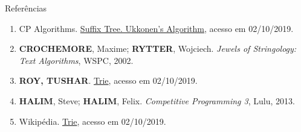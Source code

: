 \begin{frame}[fragile]{Referências}

    \begin{enumerate}
        \item CP Algorithms. \href{https://cp-algorithms.com/string/suffix-tree-ukkonen.html}{Suffix Tree. Ukkonen's Algorithm}, acesso em 02/10/2019. 
 
        \item \textbf{CROCHEMORE}, Maxime; \textbf{RYTTER}, Wojciech. \textit{Jewels of Stringology: Text Algorithms}, WSPC, 2002.

        \item \textbf{ROY, TUSHAR}. \href{https://www.youtube.com/watch?v=AXjmTQ8LEoI}{Trie}, acesso em 02/10/2019.
 
        \item \textbf{HALIM}, Steve; \textbf{HALIM}, Felix. \textit{Competitive Programming 3}, Lulu, 2013.
        \item Wikipédia. \href{https://en.wikipedia.org/wiki/Trie}{Trie}, acesso em 02/10/2019.

    \end{enumerate}

\end{frame}

